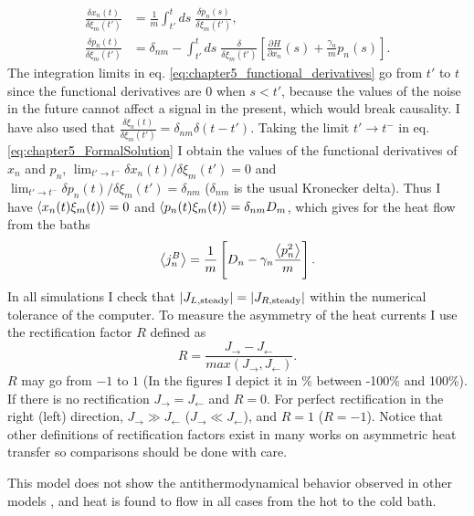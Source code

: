 %
\begin{align}
  \frac{\delta x_n(t)}{\delta \xi_m(t')} &= \frac{1}{m}\int_{t'}^{t} ds\; \frac{\delta p_n(s)}{\delta \xi_m(t')},\nonumber
  \\
  \frac{\delta p_n(t)}{\delta \xi_m(t')} &= \delta_{nm} -\int_{t'}^{t} ds\;\frac{\delta}{\delta \xi_m(t')}\left[\frac{\partial H}{\partial x_n}(s) + \frac{\gamma_n}{m}p_n(s) \right].
  \label{eq:chapter5_functional_derivatives}
\end{align}
%
The integration limits in eq. \eqref{eq:chapter5_functional_derivatives} go from $t'$ to $t$ since the functional derivatives are $0$ when $s<t'$, because the values of the noise in the future cannot affect a signal in the present, which would break causality. I have also used that $\frac{\delta \xi_n(t)}{\delta \xi_m(t')} = \delta_{nm}\delta(t-t')$. Taking the limit $t'\to t^-$ in eq. \eqref{eq:chapter5_FormalSolution} I obtain the values of the functional derivatives of $x_n$ and $p_n$, $ \lim_{t'\to t^-} \delta x_n(t)/\delta \xi_m(t') = 0$ and $\lim_{t'\to t^-} \delta p_n(t)/\delta \xi_m(t') = \delta_{nm}$ ($\delta_{nm}$ is the usual Kronecker delta). Thus I have $\expval{x_n(t) \xi_m(t)} = 0$ and $\expval{p_n(t) \xi_m(t)} = \delta_{nm}D_m$, which gives for the heat flow from the baths
%
\begin{equation}
    \expval{j^B_n} = \frac{1}{m} \left[ D_n-\gamma_n \frac{\expval{p_n^2}}{m} \right].
    \label{eq:chapter5_BathHeatFlowNovikov}
\end{equation}
%
In all simulations I check that $|J_{L,{\rm steady}}|=|J_{R,{\rm steady}}|$ within the numerical tolerance of the computer. To measure the asymmetry of the heat currents I use the rectification factor $R$ defined as
%
\begin{equation}
    R = \frac{ J_\rightarrow - J_\leftarrow}{max(J_\rightarrow,J_\leftarrow)}.
    \label{eq:chapter5_R_Factor}
\end{equation}
%
$R$ may go from $-1$ to $1$ (In the figures I depict it in \% between -100\% and 100\%). If there is no rectification $J_\rightarrow = J_\leftarrow $ and $R=0$. For perfect rectification in the right (left) direction, $J_\rightarrow \gg J_\leftarrow$ ($J_\rightarrow \ll J_\leftarrow$), and $R = 1$ ($R = -1$).
Notice that other  definitions of rectification factors exist in many works
on asymmetric heat transfer so comparisons should be done with care.
%

This model does not show the antithermodynamical behavior  observed in other models
\cite{De-Chiara2018,Levy2014}, and heat is found to flow in all cases from the hot to the
cold bath.
%
%
%
